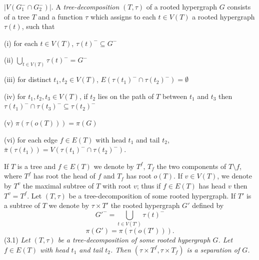 \noindent $|V(G_1^- \cap G_2^-)|$. A \textit{tree-decomposition} $(T, \tau)$ of a rooted hypergraph $G$ consists of a tree $T$ and a function $\tau$ which assigns to each $t \in V(T)$ a rooted hypergraph $\tau(t)$, such that

\hspace*{12pt}(i) for each $t \in V(T)$, $\tau(t)^- \subseteq G^-$

\hspace*{12pt}(ii) $\bigcup_{t \in V(T)} \tau(t)^- = G^-$

\hspace*{12pt}(iii) for distinct $t_1, t_2 \in V(T)$, $E(\tau(t_1)^- \cap \tau(t_2)^-) = \emptyset$

\hspace*{12pt}(iv) for $t_1, t_2, t_3 \in V(T)$, if $t_2$ lies on the path of $T$ between $t_1$ and $t_3$ then $\tau(t_1)^- \cap \tau(t_3)^- \subseteq \tau(t_2)^-$

\hspace*{12pt}(v) $\pi(\tau(o(T))) = \pi(G)$

\hspace*{12pt}(vi) for each edge $f \in E(T)$ with head $t_1$ and tail $t_2$, $\bar{\pi}(\tau(t_1)) = V(\tau(t_1)^- \cap \tau(t_2)^-)$.

If $T$ is a tree and $f \in E(T)$ we denote by $T^f$, $T_f$ the two components of $T\setminus f$, where $T^f$ has root the head of $f$ and $T_f$ has root $o(T)$. If $v \in V(T)$, we denote by $T^v$ the maximal subtree of $T$ with root $v$; thus if $f \in E(T)$ has head $v$ then $T^v = T^f$. Let $(T, \tau)$ be a tree-decomposition of some rooted hypergraph. If $T'$ is a subtree of $T$ we denote by $\tau \times T'$ the rooted hypergraph $G'$ defined by
\begin{equation*}
G'^- = \bigcup_{t \in V(T')} \tau(t)^-
\end{equation*}
\begin{equation*}
\pi(G') = \pi(\tau(o(T'))).
\end{equation*}
\stmt
(3.1) \textit{Let $(T, \tau)$ be a tree-decomposition of some rooted hypergraph $G$. Let $f \in E(T)$ with head $t_1$ and tail $t_2$. Then $(\tau \times T^f, \tau \times T_f)$ is a separation of $G$.}

